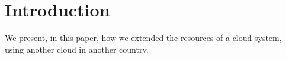 \section{Introduction}
\label{section:intro}

We present, in this paper, how we extended the resources of a cloud
system, using another cloud in another country.
%
